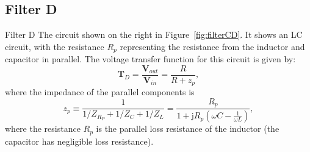 \documentclass{article}
\begin{document}
\subsection*{Filter D}
Filter D The circuit shown on the right in
Figure~\ref{fig:filterCD}. It shows an LC circuit, with the
resistance $R_p$ representing the resistance from the inductor and
capacitor in parallel. The voltage transfer function for this circuit
is given by:
\begin{equation}
  \mathbf{T}_D=\frac{\mathbf{V}_{out}}{\mathbf{V}_{in}}=\frac{R}{R+z_p},
\end{equation}
where the impedance of the parallel components is 
\begin{equation}
  z_p\equiv \frac{1}{1/Z_{R_P}+1/Z_C+1/Z_L}=
  \frac{R_p}{1+\mathrm{j}R_p\left(\omega C - \frac{1}{\omega L}\right)},
\end{equation}
where the resistance $R_p$ is the parallel loss resistance
of the inductor (the capacitor has negligible loss resistance).
\end{document}
